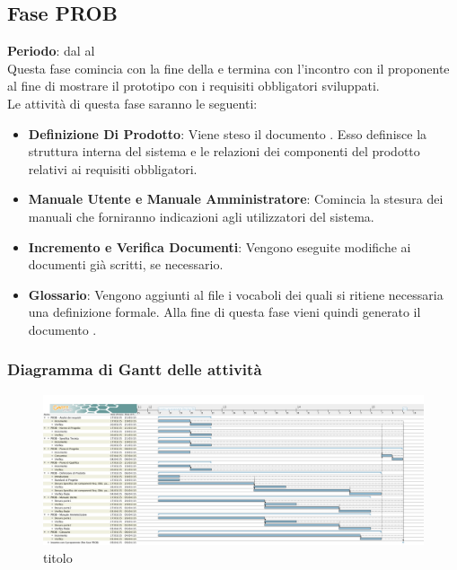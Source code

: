 \subsection{Fase PROB}
	\textbf{Periodo}: dal  al  \\Questa fase comincia con la fine della  e termina con l'incontro con il proponente al fine di mostrare il prototipo con i requisiti obbligatori sviluppati.\\Le attività di questa fase saranno le seguenti:
	\begin{itemize}
		\item\textbf{Definizione Di Prodotto}: Viene steso il documento . Esso definisce la struttura interna del sistema e le relazioni dei componenti del prodotto relativi ai requisiti obbligatori.
		\item\textbf{Manuale Utente e Manuale Amministratore}: Comincia la stesura dei manuali che forniranno indicazioni agli utilizzatori del sistema.
		\item\textbf{Incremento e Verifica Documenti}: Vengono eseguite modifiche ai documenti già scritti, se necessario.
		\item\textbf{Glossario}: Vengono aggiunti al file  i vocaboli dei quali si ritiene necessaria una definizione formale. Alla fine di questa fase vieni quindi generato il documento .
	\end{itemize}
	\subsubsection{Diagramma di Gantt delle attività}
	\begin{figure}\centering
		\includegraphics[scale=0.25]{PianoDiProgetto/Pics/FasePROB.png}
	\caption{titolo}
\end{figure}